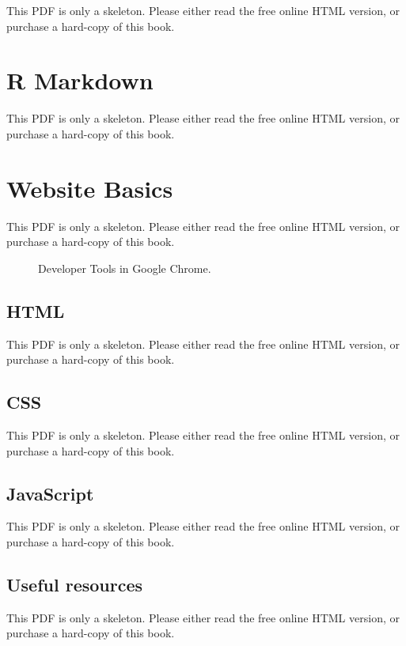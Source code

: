 \documentclass[
  12pt,
]{krantz}
\begin{document}
This PDF is only a skeleton. Please either read the free online HTML version, or purchase a hard-copy of this book.

\chapter{R Markdown}\label{r-markdown}

This PDF is only a skeleton. Please either read the free online HTML version, or purchase a hard-copy of this book.

\chapter{Website Basics}\label{website-basics}

This PDF is only a skeleton. Please either read the free online HTML version, or purchase a hard-copy of this book.

\begin{figure}\caption{Developer Tools in Google Chrome.}\end{figure}

\section{HTML}\label{html}

This PDF is only a skeleton. Please either read the free online HTML version, or purchase a hard-copy of this book.

\section{CSS}\label{css}

This PDF is only a skeleton. Please either read the free online HTML version, or purchase a hard-copy of this book.

\section{JavaScript}\label{javascript}

This PDF is only a skeleton. Please either read the free online HTML version, or purchase a hard-copy of this book.

\section{Useful resources}\label{useful-resources}

This PDF is only a skeleton. Please either read the free online HTML version, or purchase a hard-copy of this book.
\end{document}
